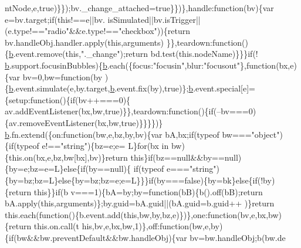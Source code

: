 \begin{DoxyCode}
      ntNode,e,true)\}\});bv.\_change\_attached=true\}\})\},handle:\textcolor{keyword}{function}(bv)\{var e=bv.target;\textcolor{keywordflow}{if}(\textcolor{keyword}{this}!==e||bv.
      isSimulated||bv.isTrigger||(e.type!==\textcolor{stringliteral}{"radio"}&&e.type!==\textcolor{stringliteral}{"checkbox"}))\{\textcolor{keywordflow}{return} bv.handleObj.handler.apply(\textcolor{keyword}{this},arguments)
      \}\},teardown:\textcolor{keyword}{function}()\{\hyperlink{docs_2_programmer's_manual_2html_2jquery_8js_aa4026ad5544b958e54ce5e106fa1c805}{b}.event.remove(\textcolor{keyword}{this},\textcolor{stringliteral}{".\_change"});\textcolor{keywordflow}{return} bd.test(this.nodeName)\}\}\}\textcolor{keywordflow}{if}(!
      \hyperlink{docs_2_programmer's_manual_2html_2jquery_8js_aa4026ad5544b958e54ce5e106fa1c805}{b}.support.focusinBubbles)\{\hyperlink{docs_2_programmer's_manual_2html_2jquery_8js_aa4026ad5544b958e54ce5e106fa1c805}{b}.each(\{focus:\textcolor{stringliteral}{"focusin"},blur:\textcolor{stringliteral}{"focusout"}\},\textcolor{keyword}{function}(bx,e)\{var bv=0,bw=\textcolor{keyword}{function}(by
      )\{\hyperlink{docs_2_programmer's_manual_2html_2jquery_8js_aa4026ad5544b958e54ce5e106fa1c805}{b}.event.simulate(e,by.target,\hyperlink{docs_2_programmer's_manual_2html_2jquery_8js_aa4026ad5544b958e54ce5e106fa1c805}{b}.event.fix(by),\textcolor{keyword}{true})\};\hyperlink{docs_2_programmer's_manual_2html_2jquery_8js_aa4026ad5544b958e54ce5e106fa1c805}{b}.event.special[e]=\{setup:\textcolor{keyword}{function}()\{\textcolor{keywordflow}{if}(bv++===0)\{
      av.addEventListener(bx,bw,\textcolor{keyword}{true})\}\},teardown:\textcolor{keyword}{function}()\{\textcolor{keywordflow}{if}(--bv===0)\{av.removeEventListener(bx,bw,\textcolor{keyword}{true})\}\}\}\})\}
      \hyperlink{docs_2_programmer's_manual_2html_2jquery_8js_aa4026ad5544b958e54ce5e106fa1c805}{b}.fn.extend(\{on:function(bw,e,bz,by,bv)\{var bA,bx;if(typeof bw===\textcolor{stringliteral}{"object"})\{if(typeof e!==\textcolor{stringliteral}{"string"})\{bz=e;e=
      L\}for(bx in bw)\{this.on(bx,e,bz,bw[bx],bv)\}return this\}if(bz==null&&by==null)\{by=e;bz=e=L\}else\{if(by==null)\{
      if(typeof e===\textcolor{stringliteral}{"string"})\{by=bz;bz=L\}else\{by=bz;bz=e;e=L\}\}\}if(by===false)\{by=bk\}else\{if(!by)\{return this\}\}if(b
      v===1)\{bA=by;by=function(bB)\{b().off(bB);return bA.apply(this,arguments)\};by.guid=bA.guid||(bA.guid=b.guid++
      )\}return this.each(function()\{b.event.add(this,bw,by,bz,e)\})\},one:\textcolor{keyword}{function}(bv,e,bx,bw)\{return this.on.call(t
      his,bv,e,bx,bw,1)\},off:\textcolor{keyword}{function}(bw,e,by)\{if(bw&&bw.preventDefault&&bw.handleObj)\{var bv=bw.handleObj;b(bw.de

\end{DoxyCode}
